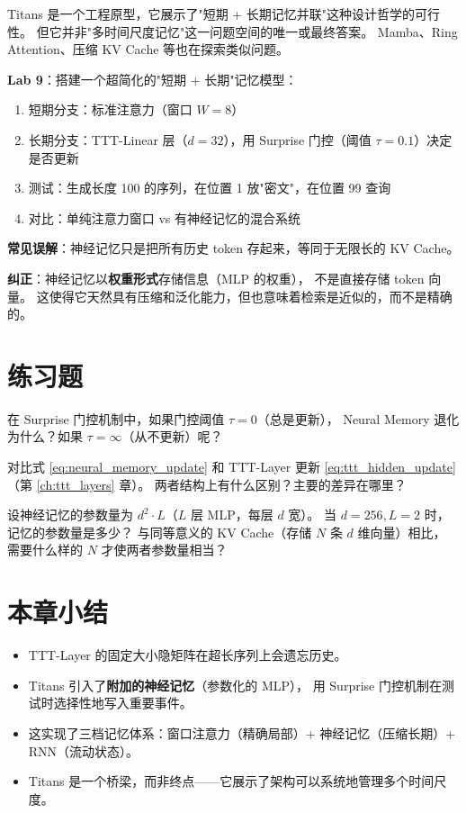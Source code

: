 \begin{viewpointbox}
Titans 是一个工程原型，它展示了"短期 + 长期记忆并联"这种设计哲学的可行性。
但它并非"多时间尺度记忆"这一问题空间的唯一或最终答案。
Mamba、Ring Attention、压缩 KV Cache 等也在探索类似问题。
\end{viewpointbox}

\begin{labbox}
\textbf{Lab 9}：搭建一个超简化的"短期 + 长期"记忆模型：

\begin{enumerate}
  \item 短期分支：标准注意力（窗口 $W=8$）
  \item 长期分支：TTT-Linear 层（$d=32$），用 Surprise 门控（阈值 $\tau=0.1$）决定是否更新
  \item 测试：生成长度 100 的序列，在位置 1 放"密文"，在位置 99 查询
  \item 对比：单纯注意力窗口 vs 有神经记忆的混合系统
\end{enumerate}
\end{labbox}

\begin{misconceptionbox}
\textbf{常见误解}：神经记忆只是把所有历史 token 存起来，等同于无限长的 KV Cache。

\textbf{纠正}：神经记忆以\textbf{权重形式}存储信息（MLP 的权重），
不是直接存储 token 向量。
这使得它天然具有压缩和泛化能力，但也意味着检索是近似的，而不是精确的。
\end{misconceptionbox}

\section{练习题}

\begin{exercise}
在 Surprise 门控机制中，如果门控阈值 $\tau = 0$（总是更新），
Neural Memory 退化为什么？如果 $\tau = \infty$（从不更新）呢？
\end{exercise}

\begin{exercise}
对比式 \eqref{eq:neural_memory_update} 和 TTT-Layer 更新 \eqref{eq:ttt_hidden_update}（第 \ref{ch:ttt_layers} 章）。
两者结构上有什么区别？主要的差异在哪里？
\end{exercise}

\begin{exercise}
设神经记忆的参数量为 $d^2 \cdot L$（$L$ 层 MLP，每层 $d$ 宽）。
当 $d=256, L=2$ 时，记忆的参数量是多少？
与同等意义的 KV Cache（存储 $N$ 条 $d$ 维向量）相比，
需要什么样的 $N$ 才使两者参数量相当？
\end{exercise}

\section{本章小结}

\begin{itemize}
  \item TTT-Layer 的固定大小隐矩阵在超长序列上会遗忘历史。
  \item Titans 引入了\textbf{附加的神经记忆}（参数化的 MLP），
        用 Surprise 门控机制在测试时选择性地写入重要事件。
  \item 这实现了三档记忆体系：窗口注意力（精确局部）+ 神经记忆（压缩长期）+ RNN（流动状态）。
  \item Titans 是一个桥梁，而非终点——它展示了架构可以系统地管理多个时间尺度。
\end{itemize}
